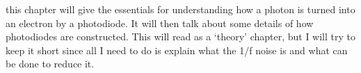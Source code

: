 this chapter will give the essentials for understanding how a photon is turned into an electron by a photodiode. It will then talk about some details of how photodiodes are constructed. This will read as a `theory' chapter, but I will try to keep it short since all I need to do is explain what the 1/f noise is and what can be done to reduce it.
